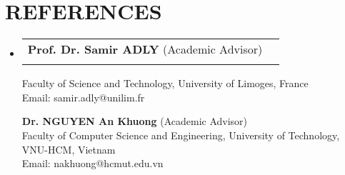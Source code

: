\documentclass[letterpaper,11pt]{article}
\makeatletter
\newcommand{\resumeProjectHeading}[2]{
    \item
    \begin{tabular*}{0.97\textwidth}{l@{\extracolsep{\fill}}r}
      \small#1 & #2 \\
    \end{tabular*}\vspace{-7pt}
}
\newcommand{\resumeSubHeadingListStart}{\begin{itemize}[leftmargin=0.15in, label={}]}
\newcommand{\resumeSubHeadingListEnd}{\end{itemize}}
\makeatother
\begin{document}
\section{\textbf{REFERENCES}}
\resumeSubHeadingListStart

\resumeProjectHeading
{\textbf{Prof. Dr. Samir ADLY} (Academic Advisor)}\\
{Faculty of Science and Technology, University of Limoges, France}{}\\
Email: samir.adly@unilim.fr


  {\textbf{Dr. NGUYEN An Khuong} (Academic Advisor)}\\
{Faculty of Computer Science and Engineering, University of Technology, VNU-HCM, Vietnam}{}\\
Email: nakhuong@hcmut.edu.vn


\resumeSubHeadingListEnd
\end{document}
